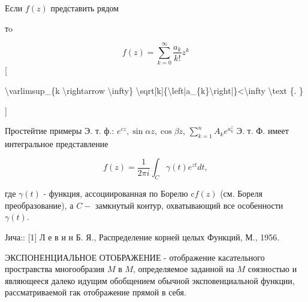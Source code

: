 \documentclass[10pt]{article}
\begin{document}
Если $f(z)$ представить рядом



тo



\[

f(z)=\sum_{k=0}^{\infty} \frac{a_{k}}{k !} z^{k}

\][



\textbackslash varlimsup\_\{k \textbackslash rightarrow \textbackslash infty\} \textbackslash sqrt[k]\{\textbackslash left|a\_\{k\}\textbackslash right|\}<\textbackslash infty \textbackslash text \{. \}

]



Простейтие примеры Э. т. ф.: $e^{c z}, \sin \alpha z, \cos \beta z$, $\sum_{k=1}^{n} A_{k} e^{a_{k}^{z}}$ Э. т. Ф. имеет интегральное представление



\[

f(z)=\frac{1}{2 \pi i} \int_{C} \gamma(t) e^{z t} d t,

\]



где $\gamma(t)$ - функция, ассоциированная по Борелю $\mathrm{c} f(z)$ (см. Бореля преобразование), а $C-$ замкнутый контур, охватывающий все особенности $\gamma(t)$.



Јича:: [1] Л е в и н Б. Я., Распределение корней целых Функций, М., 1956.



ЭКСПОНЕНЦИАЛЬНОЕ ОТОБРАЖЕНИЕ - отображение касательного простравства многообразия $M$ в $M$, определяемое заданной на $M$ сөязностью и являющееся далеко идущим обобщением обычной эксповенциальной функции, рассматриваемой гак отображение прямой в себя.
\end{document}
